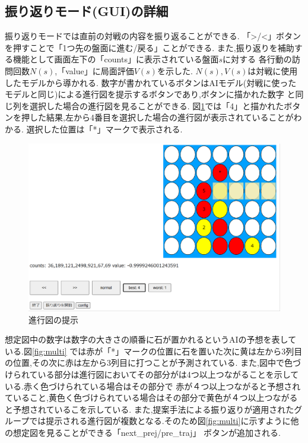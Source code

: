 \subsection{振り返りモード(GUI)の詳細}
振り返りモードでは直前の対戦の内容を振り返ることができる.
「>/<」ボタンを押すことで「1つ先の盤面に進む/戻る」ことができる.
また,振り返りを補助する機能として画面左下の「counts」に表示されている盤面$s$に対する
各行動の訪問回数$N(s)$,「value」に局面評価$V(s)$を示した.
$N(s),V(s)$は対戦に使用したモデルから導かれる.
数字が書かれているボタンはAIモデル(対戦に使ったモデルと同じ)による進行図を提示するボタンであり,ボタンに描かれた数字
と同じ列を選択した場合の進行図を見ることができる.
図\ref{fig:number-button}では「4」と描かれたボタンを押した結果,左から4番目を選択した場合の進行図が表示されていることがわかる.
選択した位置は「*」マークで表示される.
\begin{figure}[t]
	\centering
    \includegraphics[width=\linewidth]{./figure/trajSystem.pdf}
	\caption{進行図の提示}
	\label{fig:number-button}
\end{figure}
想定図中の数字は数字の大きさの順番に石が置かれるというAIの予想を表している.図\ref{fig:multi}
では赤が「*」マークの位置に石を置いた次に黄は左から3列目の位置,その次に赤は左から3列目に打つことが予測されている.
また,図中で色づけられている部分は進行図においてその部分がは4つ以上つながることを示している.赤く色づけられている場合はその部分で
赤が４つ以上つながると予想されていること,黄色く色づけられている場合はその部分で黄色が４つ以上つながると予想されているこを示している.
また,提案手法による振り返りが適用されたグループでは提示される進行図が複数となる.そのため図\ref{fig:multi}に示すように他の想定図を見ることができる「next\_prej/pre\_traj」
ボタンが追加される.
